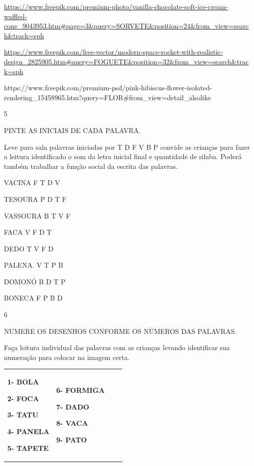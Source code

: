 {\url{https://www.freepik.com/premium-photo/vanilla-chocolate-soft-ice-cream-waffled-cone_9043953.htm\#page=3\&query=SORVETE\&position=24\&from_view=search\&track=sph}

\url{https://www.freepik.com/free-vector/modern-space-rocket-with-realistic-design_2825905.htm\#query=FOGUETE\&position=32\&from_view=search\&track=sph}

https://www.freepik.com/premium-psd/pink-hibiscus-flower-isolated-rendering\_15458965.htm?query=FLOR\#from\_view=detail\_alsolike

\num{5}

PINTE AS INICIAIS DE CADA PALAVRA.

Leve para sala palavras iniciadas por T D F V B P convide as crianças
para fazer a leitura identificado o som da letra inicial final e
quantidade de silaba. Poderá também trabalhar a função social da escrita
das palavras.

VACINA F T D V

TESOURA P D T F

VASSOURA B T V F

FACA V F D T

DEDO T V F D

PALENA. V T P B

DOMONÓ B D T P

BONECA F P B D

\num{6}

NUMERE OS DESENHOS CONFORME OS NÚMEROS DAS PALAVRAS.

Faça leitura individual das palavras com as crianças levando identificar
sua numeração para colocar na imagem certa.

\begin{longtable}[]{@{}llll@{}}
\toprule
\begin{minipage}[b]{0.24\columnwidth}\raggedright\strut
\textbf{1- BOLA}

\textbf{2- FOCA}

\textbf{3- TATU}

\textbf{4- PANELA}

\textbf{5- TAPETE}\strut
\end{minipage} & \begin{minipage}[b]{0.24\columnwidth}\raggedright\strut
\textbf{6- FORMIGA}

\textbf{7- DADO}

\textbf{8- VACA}

\textbf{9- PATO}


\end{minipage}
\end{longtable}}

